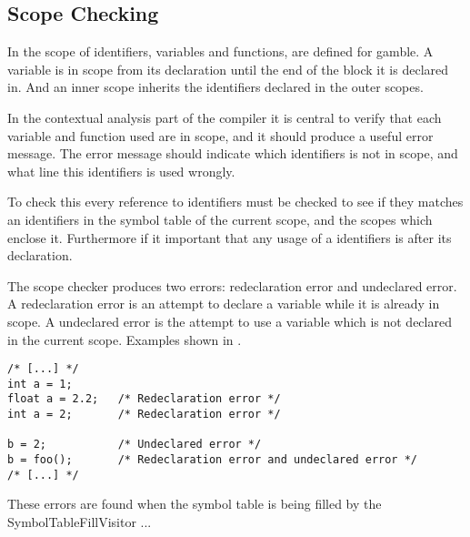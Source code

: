 \subsection*{Scope Checking}
In  the scope of identifiers, variables and functions, are defined for \gls{gamble}.
A variable is in scope from its declaration until the end of the block it is declared in.
And an inner scope inherits the identifiers declared in the outer scopes. 

In the contextual analysis part of the compiler it is central to verify that each variable and function used are in scope, and it should produce a useful error message.
The error message should indicate which identifiers is not in scope, and what line this identifiers is used wrongly.

To check this every reference to identifiers must be checked to see if they matches an identifiers in the symbol table of the current scope, and the scopes which enclose it. 
Furthermore if it important that any usage of a identifiers is after its declaration.

The scope checker produces two errors: redeclaration error and undeclared error.
A redeclaration error is an attempt to declare a variable while it is already in scope.
A undeclared error is the attempt to use a variable which is not declared in the current scope. 
Examples shown in .

\begin{lstlisting}[caption=Examples of scope errors in \gls{gamble}, numbers=none,frame=tlrb,label={lst:scopeErrors}]
/* [...] */
int a = 1;
float a = 2.2;   /* Redeclaration error */
int a = 2;       /* Redeclaration error */ 

b = 2;           /* Undeclared error */
b = foo();       /* Redeclaration error and undeclared error */ 
/* [...] */
\end{lstlisting}

These errors are found when the symbol table is being filled by the SymbolTableFillVisitor ... 
